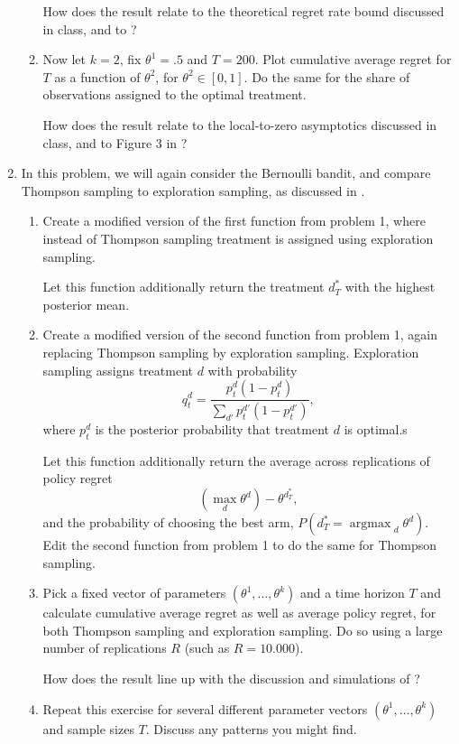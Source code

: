 \documentclass[11pt,letterpaper]{article}
\DeclareMathOperator*{\argmax}{argmax\;}
\begin{document}
\begin{enumerate}
\begin{enumerate}
  How does the result relate to the theoretical regret rate bound discussed in class, and to \cite{agrawal2012analysis}? 
  
  \item Now let $k=2$, fix $\theta^1 = .5$ and $T = 200$.
  Plot cumulative average regret for $T$ as a function of $\theta^2$, for $\theta^2 \in [0,1]$. Do the same for the share of observations assigned to the optimal treatment.
  
  How does the result relate to the local-to-zero asymptotics discussed in class, and to Figure 3 in \cite{wager2021diffusion}? 
  
\end{enumerate}
\vspace{12pt}

\item In this problem, we will again consider the Bernoulli bandit, and compare Thompson sampling to exploration sampling, as discussed in \cite{adaptive2019}.
\begin{enumerate}
  \item Create a modified version of the first function from problem 1, where instead of Thompson sampling treatment is assigned using exploration sampling.
  
  Let this function additionally return the treatment $d_T^*$ with the highest posterior mean.
  
  \item Create a modified version of the second function from problem 1, again replacing Thompson sampling by exploration sampling.
  Exploration sampling assigns treatment $d$ with probability
  $$
    q^d_t = \frac{p^d_t (1-p^d_t)}{\sum_{d'} p^{d'}_t (1-p^{d'}_t)},
  $$
  where $p^d_t$ is the posterior probability that treatment $d$ is optimal.s
  
  Let this function additionally return the average across replications of policy regret 
  $$\left(\max_d \theta^d\right) - \theta^{d_T^*},$$ and the probability of choosing the best arm, $P(d_T^* = \argmax_d \theta^d)$.
  Edit the second function from problem 1 to do the same for Thompson sampling.
  
  \item Pick a fixed vector of parameters $(\theta^1, \ldots, \theta^k)$ and a time horizon $T$ and calculate cumulative average regret as well as average policy regret, for both Thompson sampling and exploration sampling. Do so using a large number of replications $R$ (such as $R= 10.000$).
  
  How does the result line up with the discussion and simulations of \cite{adaptive2019}?
  
  \item Repeat this exercise for several different parameter vectors $(\theta^1, \ldots, \theta^k)$ and sample sizes $T$.
  Discuss any patterns you might find.
  
\end{enumerate}
\end{enumerate}




\end{document}
